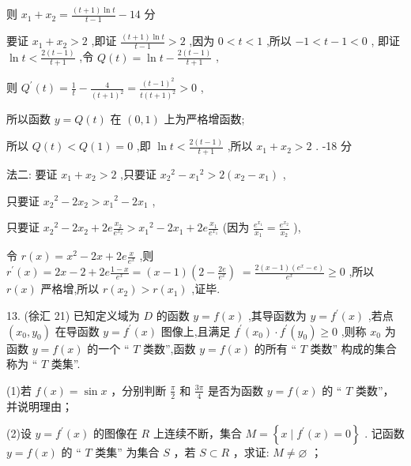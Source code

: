 \documentclass[10pt]{article}
\begin{document}
则 \({x}_{1} + {x}_{2} = \frac{\left( {t + 1}\right) \ln t}{t - 1} - {14}\) 分

要证 \({x}_{1} + {x}_{2} > 2\) ,即证 \(\frac{\left( {t + 1}\right) \ln t}{t - 1} > 2\) ,因为 \(0 < t < 1\) ,所以 \(- 1 < t - 1 < 0\) , 即证 \(\ln t < \frac{2\left( {t - 1}\right) }{t + 1}\) ,令 \(Q\left( t\right)  = \ln t - \frac{2\left( {t - 1}\right) }{t + 1}\) ,

则 \({Q}^{\prime }\left( t\right)  = \frac{1}{t} - \frac{4}{{\left( t + 1\right) }^{2}} = \frac{{\left( t - 1\right) }^{2}}{t{\left( t + 1\right) }^{2}} > 0\) ,

所以函数 \(y = Q\left( t\right)\) 在 \(\left( {0,1}\right)\) 上为严格增函数;

所以 \(Q\left( t\right)  < Q\left( 1\right)  = 0\) ,即 \(\ln t < \frac{2\left( {t - 1}\right) }{t + 1}\) ,所以 \({x}_{1} + {x}_{2} > 2\) . -18 分

法二: 要证 \({x}_{1} + {x}_{2} > 2\) ,只要证 \({x}_{2}{}^{2} - {x}_{1}{}^{2} > 2\left( {{x}_{2} - {x}_{1}}\right)\) ,

只要证 \({x}_{2}{}^{2} - 2{x}_{2} > {x}_{1}{}^{2} - 2{x}_{1}\) ,

只要证 \({x}_{2}{}^{2} - 2{x}_{2} + {2e}\frac{{x}_{2}}{{e}^{{x}_{2}}} > {x}_{1}{}^{2} - 2{x}_{1} + {2e}\frac{{x}_{1}}{{e}^{{x}_{1}}}\) (因为 \(\frac{{e}^{{x}_{1}}}{{x}_{1}} = \frac{{e}^{{x}_{2}}}{{x}_{2}}\) ),

令 \(r\left( x\right)  = {x}^{2} - {2x} + {2e}\frac{x}{{e}^{x}}\) ,则 \({r}^{\prime }\left( x\right)  = {2x} - 2 + {2e}\frac{1 - x}{{e}^{x}} = \left( {x - 1}\right) \left( {2 - \frac{2e}{{e}^{x}}}\right) \; = \frac{2\left( {x - 1}\right) \left( {{e}^{x} - e}\right) }{{e}^{x}} \geq  0\) ,所以 \(r\left( x\right)\) 严格增,所以 \(r\left( {x}_{2}\right)  > r\left( {x}_{1}\right)\) ,证毕.

13. (徐汇 21) 已知定义域为 \(D\) 的函数 \(y = f\left( x\right)\) ,其导函数为 \(y = {f}^{\prime }\left( x\right)\) ,若点 \(\left( {{x}_{0},{y}_{0}}\right)\) 在导函数 \(y = {f}^{\prime }\left( x\right)\) 图像上,且满足 \({f}^{\prime }\left( {x}_{0}\right)  \cdot  {f}^{\prime }\left( {y}_{0}\right)  \geq  0\) ,则称 \({x}_{0}\) 为函数 \(y = f\left( x\right)\) 的一个 “ \(T\) 类数”,函数 \(y = f\left( x\right)\) 的所有 “ \(T\) 类数” 构成的集合称为 “ \(T\) 类集”.

(1)若 \(f\left( x\right)  = \sin x\) ，分别判断 \(\frac{\pi }{2}\) 和 \(\frac{3\pi }{4}\) 是否为函数 \(y = f\left( x\right)\) 的 “ \(T\) 类数”，并说明理由；

(2)设 \(y = {f}^{\prime }\left( x\right)\) 的图像在 \(R\) 上连续不断，集合 \(M = \left\{  {x \mid  {f}^{\prime }\left( x\right)  = 0}\right\}\) . 记函数 \(y = f\left( x\right)\) 的 “ \(T\) 类集” 为集合 \(S\) ，若 \(S \subset  R\) ，求证: \(M \neq  \varnothing\) ；
\end{document}
